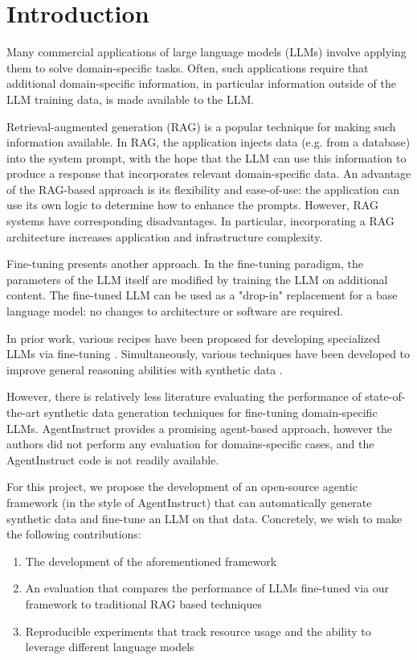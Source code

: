 \section{Introduction}
Many commercial applications of large language models (LLMs) involve applying them to solve domain-specific tasks. Often, such applications require that additional domain-specific information, in particular information outside of the LLM training data, is made available to the LLM.

Retrieval-augmented generation (RAG) \citep{lewis_retrieval-augmented_2020} is a
popular technique for making such information available. In RAG, the application
injects data (e.g. from a database) into the system prompt, with the hope that
the LLM can use this information to produce a response that incorporates
relevant domain-specific data. An advantage of the RAG-based approach is its
flexibility and ease-of-use: the application can use its own logic to determine
how to enhance the prompts. However, RAG systems have corresponding
disadvantages. In particular, incorporating a RAG architecture increases
application and infrastructure complexity.

Fine-tuning presents another approach. In the fine-tuning paradigm, the parameters of the LLM itself are modified by training the LLM on additional content. The fine-tuned LLM can be used as a "drop-in" replacement for a base language model: no changes to architecture or software are required.

In prior work, various recipes have been proposed for developing specialized LLMs via fine-tuning \citep{balaguer_rag_2024,yang_fingpt_2023,wu_pmc-llama_2023}. Simultaneously, various techniques have been developed to improve general reasoning abilities with synthetic data \citep{shao_synthetic_2023,wang_self-instruct_2023,mitra_agentinstruct_2024}.

However, there is relatively less literature evaluating the performance of
state-of-the-art synthetic data generation techniques for fine-tuning
domain-specific LLMs. AgentInstruct \citep{mitra_agentinstruct_2024} provides a promising
agent-based approach, however the authors did not perform any evaluation for
domains-specific cases, and the AgentInstruct code is not readily available.

For this project, we propose the development of an open-source agentic framework
(in the style of AgentInstruct) that can automatically generate synthetic data
and fine-tune an LLM on that data. Concretely, we wish to make the following
contributions:

\begin{enumerate}
\item The development of the aforementioned framework
\item An evaluation that compares the performance of LLMs fine-tuned via our framework to traditional RAG based techniques
\item Reproducible experiments that track resource usage and the ability to leverage different language models
\end{enumerate}
